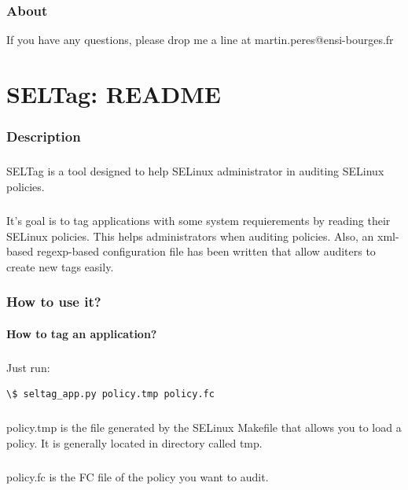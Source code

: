 \subsection*{About}
If you have any questions, please drop me a line at martin.peres@ensi-bourges.fr

\chapter{SELTag: README}
	\label{SELTag}
\subsection*{Description}
\paragraph*{}
SELTag is a tool designed to help SELinux administrator in auditing SELinux policies.

\paragraph*{}
It's goal is to tag applications with some system requierements by reading their SELinux policies.
This helps administrators when auditing policies. Also, an xml-based regexp-based configuration file 
has been written that allow auditers to create new tags easily.

\subsection*{How to use it?}
\subsubsection*{How to tag an application?}
\paragraph*{}
Just run:
\begin{verbatim}
\$ seltag_app.py policy.tmp policy.fc
\end{verbatim}

\paragraph*{}
policy.tmp is the file generated by the SELinux Makefile that allows you to load a policy. 
It is generally located in directory called tmp.

\paragraph*{}
policy.fc is the FC file of the policy you want to audit.

